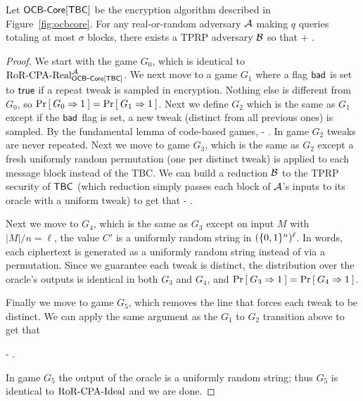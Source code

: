 \begin{theorem}
Let $\mathsf{OCB\mbox{-} Core}[\mathsf{TBC}]$ be the encryption algorithm described in Figure~\ref{fig:ocbcore}. For any real-or-random adversary ${\mathcal A}$ making $q$ queries totaling at most $\sigma$ blocks, there exists a TPRP adversary ${\mathcal B}$ so that
\bnm
\AdvROR{\ocbcore[\tbc]}{\advA} \leq \AdvTPRP{\tbc}{\advB} + \; .
\enm
\end{theorem}
\begin{proof}

  
We start with the game $G_0$, which is identical to $\text{RoR-CPA-Real}^{\mathcal A}_{\mathsf{OCB\mbox{-} Core}[\mathsf{TBC}]}$. We next move to a game $G_1$ where a flag $\mathsf{bad}$ is set to $\mathsf{true}$ if a repeat tweak is sampled in encryption. Nothing else is different from $G_0$, so $\Pr\left[\: G_0\Rightarrow 1 \:\right] = \Pr\left[\: G_1\Rightarrow 1 \:\right]$. Next we define $G_2$ which is the same as $G_1$ except if the $\mathsf{bad}$ flag is set, a new tweak (distinct from all previous ones) is sampled. By the fundamental lemma of code-based games, 
\bnm
\left\lvert{} - \right\rvert \leq {}\; .
\enm
In game $G_2$ tweaks are never repeated. Next we move to game $G_3$, which is the same as $G_2$ except a fresh uniformly random permutation (one per distinct tweak) is applied to each message block instead of the TBC. We can build a reduction ${\mathcal B}$ to the TPRP security of $\mathsf{TBC}$ (which reduction simply passes each block of ${\mathcal A}$'s inputs to its oracle with a uniform tweak) to get that
\bnm
\left\lvert{} - \right\rvert \leq \AdvTPRP{\tbc}{\advB}\; .
\enm

Next we move to $G_4$, which is the same as $G_3$ except on input $M$ with $|M|/n = \ell$, the value $C'$ is a uniformly random string in $(\{0,1\}^{n})^\ell$. In words, each ciphertext is generated as a uniformly random string instead of via a permutation. Since we guarantee each tweak is distinct, the distribution over the oracle's outputs is identical in both $G_3$ and $G_4$, and $\Pr\left[\: G_3\Rightarrow 1 \:\right] = \Pr\left[\: G_4\Rightarrow 1 \:\right]$. 

Finally we move to game $G_5$, which removes the line that forces each tweak to be distinct. We can apply the same argument as the $G_1$ to $G_2$ transition above to get that

\bnm
\left\lvert{} - \right\rvert \leq {}\; .
\enm

In game $G_5$ the output of the oracle is a uniformly random string; thus $G_5$ is identical to $\text{RoR-CPA-Ideal}$ and we are done.\hfill\qedsym
\end{proof}
